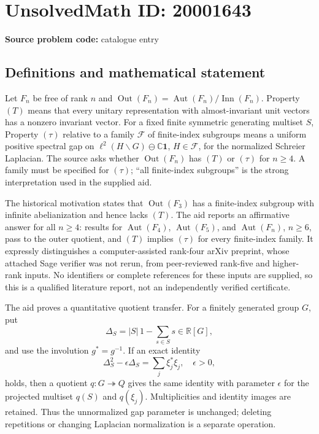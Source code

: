 \documentclass[11pt]{article}
\newcommand{\R}{\mathbb{R}}
\newcommand{\C}{\mathbb{C}}
\begin{document}
\section*{UnsolvedMath ID: 20001643}
\textbf{Source problem code:} catalogue entry
\subsection{Definitions and mathematical statement}
Let \(F_n\) be free of rank \(n\) and \(\operatorname{Out}(F_n)=\operatorname{Aut}(F_n)/\operatorname{Inn}(F_n)\). Property \((T)\) means that every unitary representation with almost-invariant unit vectors has a nonzero invariant vector. For a fixed finite symmetric generating multiset \(S\), Property \((\tau)\) relative to a family \(\mathcal F\) of finite-index subgroups means a uniform positive spectral gap on
\(\ell^2(H\backslash G)\ominus\C\mathbf1\), \(H\in\mathcal F\), for the normalized Schreier Laplacian. The source asks whether \(\operatorname{Out}(F_n)\) has \((T)\) or \((\tau)\) for \(n\ge4\). A family must be specified for \((\tau)\); ``all finite-index subgroups'' is the strong interpretation used in the supplied aid.

The historical motivation states that \(\operatorname{Out}(F_3)\) has a finite-index subgroup with infinite abelianization and hence lacks \((T)\). The aid reports an affirmative answer for all \(n\ge4\): results for \(\operatorname{Aut}(F_4)\), \(\operatorname{Aut}(F_5)\), and \(\operatorname{Aut}(F_n)\), \(n\ge6\), pass to the outer quotient, and \((T)\) implies \((\tau)\) for every finite-index family. It expressly distinguishes a computer-assisted rank-four arXiv preprint, whose attached Sage verifier was not rerun, from peer-reviewed rank-five and higher-rank inputs. No identifiers or complete references for these inputs are supplied, so this is a qualified literature report, not an independently verified certificate.

The aid proves a quantitative quotient transfer. For a finitely generated group \(G\), put
\[
 \Delta_S=|S|\,1-\sum_{s\in S}s\in\R[G],
\]
and use the involution \(g^*=g^{-1}\). If an exact identity
\[
 \Delta_S^2-\epsilon\Delta_S=\sum_j\xi_j^*\xi_j,\quad \epsilon>0,
\]
holds, then a quotient \(q:G\twoheadrightarrow Q\) gives the same identity with parameter \(\epsilon\) for the projected multiset \(q(S)\) and \(q(\xi_j)\). Multiplicities and identity images are retained. Thus the unnormalized gap parameter is unchanged; deleting repetitions or changing Laplacian normalization is a separate operation.
\end{document}
